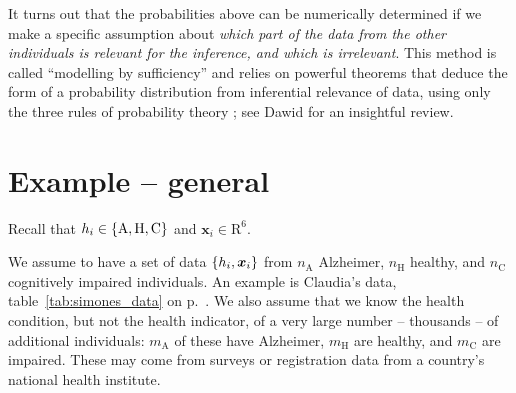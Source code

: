 \documentclass[\ifafour a4paper,12pt,\else a5paper,10pt,\fi%
onecolumn,oneside,article,%
british%
]{memoir}
\theoremstyle{remark}
\theoremstyle{innote}
\newcommand*{\citey}{\parencites*}
\renewcommand*{\cites}{\parencites}
\newcommand*{\RR}{\bm{\mathrm{R}}}
\DeclarePairedDelimiter\set{\{}{\}}
\renewcommand*{\|}{\mathpunct{|}}
\newcommand*{\sect}{\S}%
\newcommand*{\chap}{ch.}%
\newcommand*{\eg}{{e.g.}}
\newcommand*{\yH}{h}
\newcommand*{\yx}{x}
\newcommand*{\yxx}{\bm{\yx}}
\newcommand*{\ya}{\mathrm{A}}
\newcommand*{\yi}{\mathrm{C}}
\newcommand*{\yh}{\mathrm{H}}
\newcommand*{\yn}{n}
\newcommand*{\yna}{\yn_{\ya}}
\newcommand*{\ynh}{\yn_{\yh}}
\newcommand*{\yni}{\yn_{\yi}}
\newcommand*{\yNa}{m_{\ya}}
\newcommand*{\yNh}{m_{\yh}}
\newcommand*{\yNi}{m_{\yi}}
\theoremstyle{plain}
\begin{document}
\smallskip

It turns out that the probabilities above can be numerically determined if
we make a specific assumption about \emph{which part of the data from the
  other individuals is relevant for the inference, and which is
  irrelevant}. This method is called \enquote{modelling by sufficiency}
and relies on powerful theorems that deduce the form of a probability
distribution from inferential relevance of data, using only the three rules
of probability theory
\cites[\eg:][\chap~4]{bernardoetal1994_r2000}[\sect~5.5]{lindley1965b_r2008}{diaconisetal1981,lauritzen1982_r1988,kallenberg2005};
see Dawid \citey{dawid2013} for an insightful review.



\section{Example -- general}
\label{sec:example}

Recall that $\yH_i \in \set{\ya, \yh, \yi}$ and $\yxx_i \in \RR^6$.

We assume to have a set of data $\set{\yH_i,\yxx_i}$ from $\yna$ Alzheimer,
$\ynh$ healthy, and $\yni$ cognitively impaired individuals. An example is
Claudia's data, table~\ref{tab:simones_data} on
p.~\pageref{tab:simones_data}. We also assume that we know the health
condition, but not the health indicator, of a very large number --
thousands -- of additional individuals: $\yNa$ of these have Alzheimer,
$\yNh$ are healthy, and $\yNi$ are impaired. These may come from surveys or
registration data from a country's national health institute.


\medskip
\end{document}
